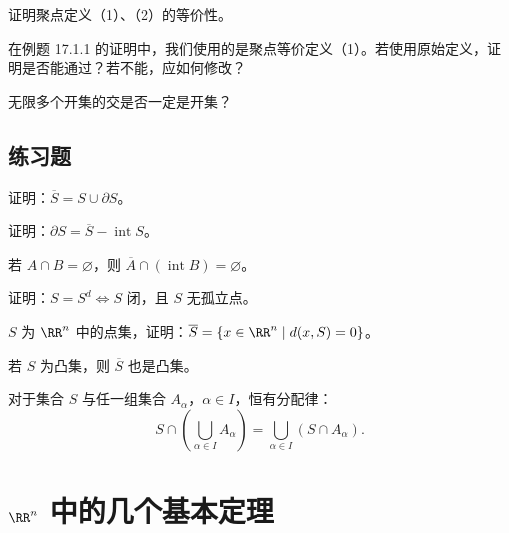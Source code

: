 \begin{xthought}[2]
证明聚点定义（1）、（2）的等价性。
\end{xthought}

\begin{xthought}[3]
在例题 17.1.1 的证明中，我们使用的是聚点等价定义（1）。若使用原始定义，证明是否能通过？若不能，应如何修改？
\end{xthought}

\begin{xthought}[4]
无限多个开集的交是否一定是开集？
\end{xthought}

\subsection{练习题}
\begin{xexercise}[1]
证明：$\overline S=S\cup\partial S$。
\end{xexercise}

\begin{xexercise}[2]
证明：$\partial S=\overline S-\operatorname{int}S$。
\end{xexercise}

\begin{xexercise}[3]
若 $A\cap B=\varnothing$，则 $\overline A\cap(\operatorname{int}B)=\varnothing$。
\end{xexercise}

\begin{xexercise}[4]
证明：$S=S^d\Longleftrightarrow S$ 闭，且 $S$ 无孤立点。
\end{xexercise}

\begin{xexercise}[5]
$S$ 为 $\RR^n$ 中的点集，证明：$\overline S=\{x\in\RR^n\mid d(x,S)=0\}$。
\end{xexercise}

\begin{xexercise}[6]
若 $S$ 为凸集，则 $\overline S$ 也是凸集。
\end{xexercise}

\begin{xexercise}[7]
对于集合 $S$ 与任一组集合 $A_\alpha$，$\alpha\in I$，恒有分配律：
  \[
    S\cap\left(\bigcup_{\alpha\in I}A_\alpha\right)
    =\bigcup_{\alpha\in I}(S\cap A_\alpha).
  \]
\end{xexercise}

\section{\texorpdfstring{$\RR^n$ 中的几个基本定理}{R n 维空间中的几个基本定理}}

